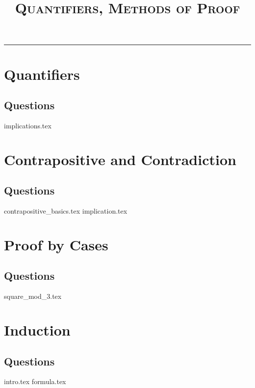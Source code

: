 \documentclass{exam}
\title{\textsc{Quantifiers, Methods of Proof}}
\date{}
\begin{document}
\maketitle
\rule{\textwidth}{0.15em}
\fontsize{12}{15}\selectfont
\thispagestyle{empty}

\section{Quantifiers}
\subsection{Questions}
\begin{questions}
{implications.tex}
\end{questions}

\section{Contrapositive and Contradiction}
\subsection{Questions}
\begin{questions}
{contrapositive_basics.tex}
{implication.tex}
\end{questions}

\section{Proof by Cases}
\subsection{Questions}
\begin{questions}
{square_mod_3.tex}
\end{questions}

\section{Induction}
\subsection{Questions}
\begin{questions}
{intro.tex}
{formula.tex}
\end{questions}
\end{document}
